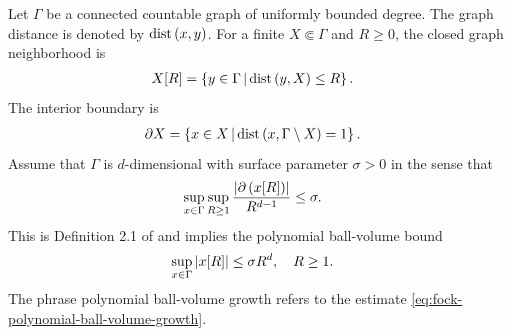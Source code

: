 \documentclass[11pt,a4paper]{article}
\theoremstyle{plain}
\theoremstyle{definition}
\theoremstyle{remark}
\begin{document}
Let \(\Gamma\) be a connected countable graph of uniformly bounded degree. The graph distance is denoted by \(\operatorname{dist} \left( x,y \right)\). For a finite \(X \Subset \Gamma\) and \(R \geq 0\), the closed graph neighborhood is \[\begin{aligned}
X[R]
& =
\left\{y \in \Gamma \, \middle| \, \operatorname{dist} \left( y,X \right) \leq R\right\}.
\end{aligned}\] The interior boundary is \[\begin{aligned}
\partial X
& =
\left\{x \in X \, \middle| \, \operatorname{dist} \left( x,\Gamma \setminus X \right) = 1\right\}.
\end{aligned}\] Assume that \(\Gamma\) is \(d\)-dimensional with surface parameter \(\sigma > 0\) in the sense that \[\begin{aligned}
\sup_{x \in \Gamma}
\sup_{R \geq 1}
\frac{\left| \partial\left( x[R] \right) \right|}{R^{d - 1}}
& \leq
\sigma.
\end{aligned}\] This is Definition 2.1 of \cite{DeuchertLampartLemm001} and implies the polynomial ball-volume bound \begin{equation}
\begin{aligned}
\sup_{x\in\Gamma}\left| x[R] \right|
& \leq
\sigma R^d,
\quad
R\geq1.
\end{aligned}
\label{eq:fock-polynomial-ball-volume-growth}
\end{equation} The phrase polynomial ball-volume growth refers to the estimate \eqref{eq:fock-polynomial-ball-volume-growth}.
\end{document}
